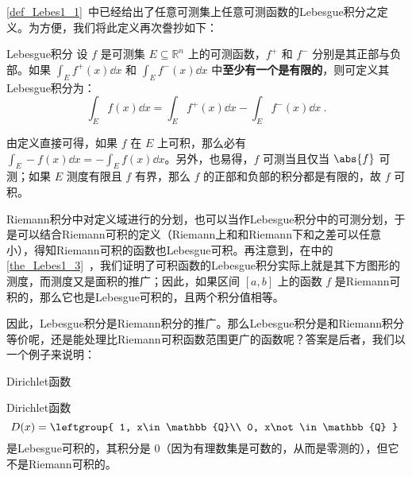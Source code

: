 

\autoref{def_Lebes1_1}~中已经给出了任意可测集上任意可测函数的Lebesgue积分之定义。为方便，我们将此定义再次誊抄如下：

\begin{definition}{Lebesgue积分}
设 $f$ 是可测集 $E\subseteq\mathbb{R}^n$ 上的可测函数，$f^+$ 和 $f^-$ 分别是其正部与负部。如果 $\int_E f^+(x) \dd x$ 和 $\int_E f^-(x) \dd x$ 中\textbf{至少有一个是有限的}，则可定义其Lebesgue积分为：
\begin{equation}
\int_E f(x) \dd x = \int_E f^+(x) \dd x - \int_E f^-(x) \dd x~.
\end{equation}
\end{definition}

由定义直接可得，如果 $f$ 在 $E$ 上可积，那么必有 $\int_E -f(x) \dd x = -\int_E f(x) \dd x$。另外，也易得，$f$ 可测当且仅当 $\abs{f}$ 可测；如果 $E$ 测度有限且 $f$ 有界，那么 $f$ 的正部和负部的积分都是有限的，故 $f$ 可积。



Riemann积分中对定义域进行的分划，也可以当作Lebesgue积分中的可测分划，于是可以结合Riemann可积的定义（Riemann上和和Riemann下和之差可以任意小），得知Riemann可积的函数也Lebesgue可积。再注意到，在中的\autoref{the_Lebes1_3}~，我们证明了可积函数的Lebesgue积分实际上就是其下方图形的测度，而测度又是面积的推广；因此，如果区间 $[a, b]$ 上的函数 $f$ 是Riemann可积的，那么它也是Lebesgue可积的，且两个积分值相等。

因此，Lebesgue积分是Riemann积分的推广。那么Lebesgue积分是和Riemann积分等价呢，还是能处理比Riemann可积函数范围更广的函数呢？答案是后者，我们以一个例子来说明：

\begin{example}{Dirichlet函数}

Dirichlet函数
\begin{equation}
D(x)=
\leftgroup{
    1, x\in\mathbb{Q}\\
    0, x\not\in\mathbb{Q}
}~
\end{equation}
是Lebesgue可积的，其积分是 $0$（因为有理数集是可数的，从而是零测的），但它不是Riemann可积的。

\end{example}
















